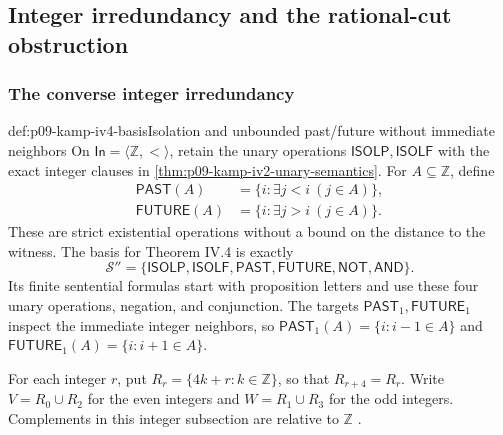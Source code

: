 
\subsection{Integer irredundancy and the rational-cut obstruction}
\label{sec:p09-kamp-iv4-iv5-separations}

\subsubsection{The converse integer irredundancy}

\begin{hbdefinition}{def:p09-kamp-iv4-basis}{Isolation and unbounded past/future without immediate neighbors}
On \(\mathsf{In}=\langle\mathbb Z,<\rangle\), retain the
unary operations \(\mathsf{ISOLP},\mathsf{ISOLF}\) with the
exact integer clauses in \cref{thm:p09-kamp-iv2-unary-semantics}.
For \(A\subseteq\mathbb Z\), define
\[
\begin{aligned}
 \mathsf{PAST}(A)&=\{i:\exists j<i\ (j\in A)\},\\
 \mathsf{FUTURE}(A)&=\{i:\exists j>i\ (j\in A)\}.
\end{aligned}
\]
These are strict existential operations without a bound on the
distance to the witness. The basis for Theorem IV.4 is exactly
\[
 \mathcal S''=
   \{\mathsf{ISOLP},\mathsf{ISOLF},\mathsf{PAST},
                       \mathsf{FUTURE},\mathsf{NOT},\mathsf{AND}\}.
\]
Its finite sentential formulas start with proposition letters and
use these four unary operations, negation, and conjunction.
The targets \(\mathsf{PAST}_1,\mathsf{FUTURE}_1\) inspect
the immediate integer neighbors, so
\(\mathsf{PAST}_1(A)=\{i:i-1\in A\}\) and
\(\mathsf{FUTURE}_1(A)=\{i:i+1\in A\}\).

For each integer \(r\), put
\(R_r=\{4k+r:k\in\mathbb Z\}\), so that
\(R_{r+4}=R_r\). Write
\(V=R_0\cup R_2\) for the even integers and
\(W=R_1\cup R_3\) for the odd integers.
Complements in this integer subsection are relative to \(\mathbb Z\)
\cite[ch.~IV, thm.~4, pp.~108--109]{Kamp1968}.
\end{hbdefinition}

